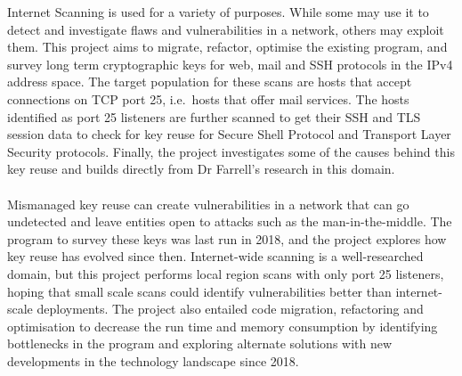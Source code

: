 Internet Scanning is used for a variety of purposes. While some may use it to detect and investigate flaws and 
vulnerabilities in a network, others may exploit them. This project aims to migrate, refactor, optimise the existing program,
and survey long term cryptographic keys for web, mail and SSH protocols in the IPv4 address space. The target population for these scans 
are hosts that accept connections on TCP port 25, i.e.\ hosts that offer mail services. The hosts identified as port 25 listeners are further 
scanned to get their SSH and TLS session data to check for key reuse for Secure Shell Protocol and Transport Layer Security protocols. 
Finally, the project investigates some of the causes behind this key reuse and builds directly from Dr Farrell's research in this domain.\\\\
Mismanaged key reuse can create vulnerabilities in a network that can go undetected and leave entities open to attacks such as the man-in-the-middle. 
The program to survey these keys was last run in 2018, and the project explores how key reuse has evolved since then. 
Internet-wide scanning is a well-researched domain, but this project performs local region scans with only port 25 listeners, hoping 
that small scale scans could identify vulnerabilities better than internet-scale deployments. The project also entailed code migration, 
refactoring and optimisation to decrease the run time and memory consumption by identifying bottlenecks in the program and 
exploring alternate solutions with new developments in the technology landscape since 2018. 



